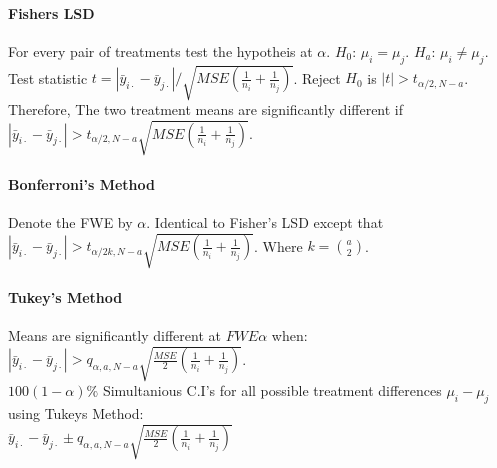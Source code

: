 \documentclass[10pt]{article}
\begin{document}
\paragraph{Fishers LSD} For every pair of treatments test the hypotheis at $\alpha$.  $H_0$: $\mu_i = \mu_j$. $H_a$: $\mu_i \neq \mu_j$. \\
Test statistic $t = \left| \bar{y}_{i \cdot} - \bar{y}_{j \cdot} \right| / \sqrt{MSE \left( \frac{1}{n_i} + \frac{1}{n_j} \right)}$. Reject $H_0$ is $\left| t \right| > t_{\alpha/2, N-a}$.\\
Therefore, The two treatment means are significantly different if $\left| \bar{y}_{i \cdot} - \bar{y}_{j \cdot} \right| > t_{\alpha/2, N-a} \sqrt{MSE \left( \frac{1}{n_i} + \frac{1}{n_j} \right)}$.


\paragraph{Bonferroni's Method} Denote the FWE by $\alpha$. Identical to Fisher's LSD except that \\
$\left| \bar{y}_{i \cdot} - \bar{y}_{j \cdot} \right| > t_{\alpha/2k, N-a} \sqrt{MSE \left( \frac{1}{n_i} + \frac{1}{n_j} \right)}$.
Where $k = \binom{a}{2}$.

\paragraph{Tukey's Method} Means are significantly different at $FWE \alpha$ when:
$\left| \bar{y}_{i \cdot} - \bar{y}_{j \cdot} \right| > q_{\alpha,a, N-a} \sqrt{\frac{MSE}{2} \left( \frac{1}{n_i} + \frac{1}{n_j} \right)}$. \\
$100(1-\alpha)\%$ Simultanious C.I's for all possible treatment differences $\mu_i - \mu_j$ using Tukeys Method: \\
$\bar{y}_{i \cdot} - \bar{y}_{j \cdot} \pm q_{\alpha,a,N-a} \sqrt{\frac{MSE}{2} \left( \frac{1}{n_i} + \frac{1}{n_j} \right)}$ 
\end{document}
